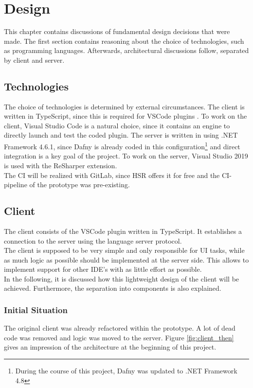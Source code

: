 \section{Design}
\label{chapter:design}
This chapter contains discussions of fundamental design decisions that were made.
The first section contains reasoning about the choice of technologies, such as programming languages.
Afterwards, architectural discussions follow, separated by client and server.

\subsection{Technologies}
The choice of technologies is determined by external circumstances.
The client is written in TypeScript, since this is required for VSCode plugins \cite{vscodeAPI}.
To work on the client, Visual Studio Code is a natural choice, since it contains an engine to directly launch and test the coded plugin.
The server is written in \CsharpWithSpace using .NET Framework 4.6.1, since Dafny is already coded in this
configuration\footnote{During the course of this project, Dafny was updated to .NET Framework 4.8} and direct integration is a key goal of the project.
To work on the server, Visual Studio 2019 is used with the ReSharper extension.\\
The CI will be realized with GitLab, since HSR offers it for free and the CI-pipeline of the prototype was pre-existing.   

\subsection{Client}
The client consists of the VSCode plugin written in TypeScript.
It establishes a connection to the server using the language server protocol.\\

The client is supposed to be very simple and only responsible for UI tasks, while as much logic as possible should be implemented at the server side.
This allows to implement support for other IDE's with as little effort as possible.\\

In the following, it is discussed how this lightweight design of the client will be achieved.
Furthermore, the separation into components is also explained.

\subsubsection{Initial Situation}
The original client was already refactored within the prototype.
A lot of dead code was removed and logic was moved to the server.
Figure \ref{fig:client_then} gives an impression of the architecture at the beginning of this project.

